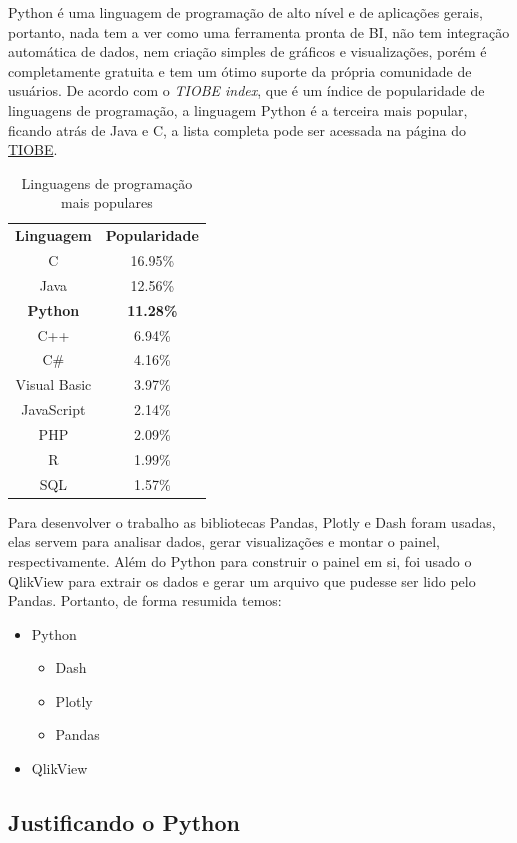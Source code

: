 Python é uma linguagem de programação de alto nível e de aplicações gerais, portanto, nada tem a ver como uma ferramenta pronta de BI, não tem integração automática de dados, nem criação simples de gráficos e visualizações, porém é completamente gratuita e tem um ótimo suporte da própria comunidade de usuários. De acordo com o \textit{TIOBE index}, que é um índice de popularidade de linguagens de programação, a linguagem Python é a terceira mais popular, ficando atrás de Java e C, a lista completa pode ser acessada na página do \href{https://www.tiobe.com/tiobe-index/}{TIOBE}.

\begin{table}[h]
	\centering
	\begin{tabular}{cc}
	\textbf{Linguagem}	& \textbf{Popularidade}  \\
	C	    &  16.95\% \\
	Java	& 12.56\% \\
	\textbf{Python}	& \textbf{11.28\%} \\
	C++	& 6.94\% \\
	C\#	& 4.16\% \\
	Visual Basic & 3.97\% \\
	JavaScript	& 2.14\% \\
	PHP	& 2.09\% \\
	R	& 1.99\% \\
	SQL	& 1.57\%
	\end{tabular}
	\caption{Linguagens de programação mais populares}
	\label{tab:my-table}
\end{table}

Para desenvolver o trabalho as bibliotecas Pandas, Plotly e Dash foram usadas, elas servem para analisar dados, gerar visualizações e montar o painel, respectivamente. Além do Python para construir o painel em si, foi usado o QlikView para extrair os dados e gerar um arquivo que pudesse ser lido pelo Pandas. Portanto, de forma resumida temos:

\begin{itemize}
	\item Python
	\begin{itemize}
		\item Dash
		\item Plotly
		\item Pandas
	\end{itemize}
	\item QlikView
\end{itemize}

\subsection{Justificando o Python}

